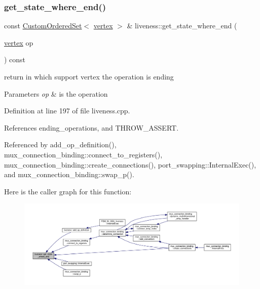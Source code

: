 \subsubsection{\texorpdfstring{get\+\_\+state\+\_\+where\+\_\+end()}{get\_state\_where\_end()}}
{\footnotesize\ttfamily const \hyperlink{classCustomOrderedSet}{Custom\+Ordered\+Set}$<$ \hyperlink{graph_8hpp_abefdcf0544e601805af44eca032cca14}{vertex} $>$ \& liveness\+::get\+\_\+state\+\_\+where\+\_\+end (\begin{DoxyParamCaption}\item[{\hyperlink{graph_8hpp_abefdcf0544e601805af44eca032cca14}{vertex}}]{op }\end{DoxyParamCaption}) const}



return in which support vertex the operation is ending 


\begin{DoxyParams}{Parameters}
{\em op} & is the operation \\
\hline
\end{DoxyParams}


Definition at line 197 of file liveness.\+cpp.



References ending\+\_\+operations, and T\+H\+R\+O\+W\+\_\+\+A\+S\+S\+E\+RT.



Referenced by add\+\_\+op\+\_\+definition(), mux\+\_\+connection\+\_\+binding\+::connect\+\_\+to\+\_\+registers(), mux\+\_\+connection\+\_\+binding\+::create\+\_\+connections(), port\+\_\+swapping\+::\+Internal\+Exec(), and mux\+\_\+connection\+\_\+binding\+::swap\+\_\+p().

Here is the caller graph for this function\+:
\nopagebreak
\begin{figure}[H]
\begin{center}
\leavevmode
\includegraphics[width=350pt]{d3/d1f/classliveness_aa84cc94d53f30327900a326f38c8d64c_icgraph}
\end{center}
\end{figure}
\mbox{\label{classliveness_adf512e3be101982e75ace23f6c1a096d}} 

